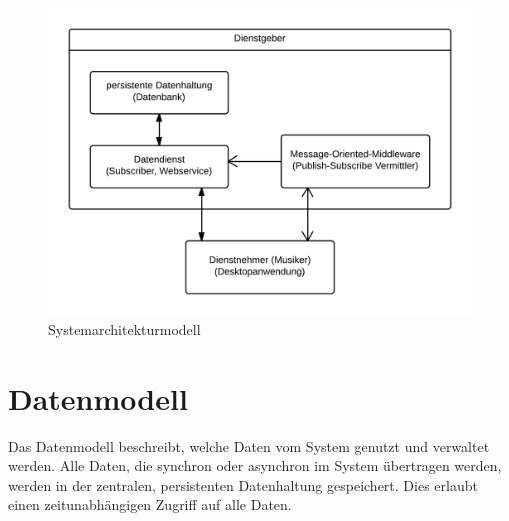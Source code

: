 \documentclass[12pt]{scrartcl}
\begin{document}
\begin{figure}
\centering
\includegraphics[scale=.25]{figures/systemarchitekturmodell}
\caption{Systemarchitekturmodell}
\label{fig:systemarchitekturmodell}
\end{figure}


\section{Datenmodell}
\label{sec:datenmodell}


Das Datenmodell beschreibt, welche Daten vom System genutzt und verwaltet werden. Alle Daten, die synchron oder asynchron im System übertragen werden, werden in der zentralen, persistenten Datenhaltung gespeichert. Dies erlaubt einen zeitunabhängigen Zugriff auf alle Daten. 
\end{document}
